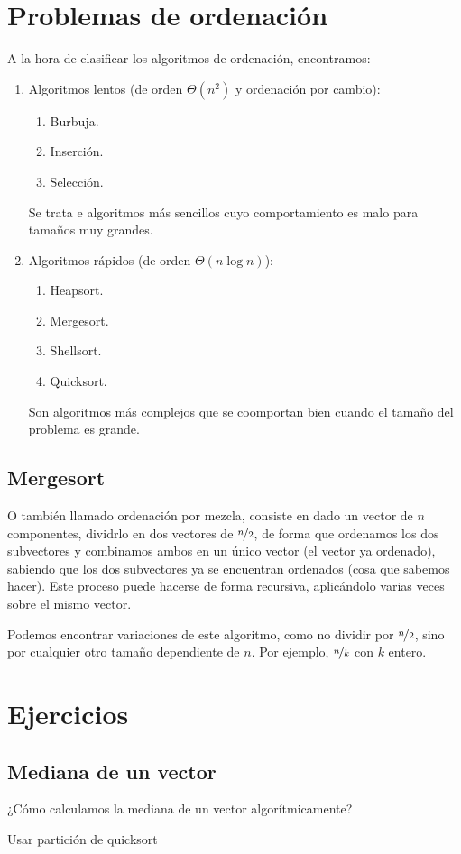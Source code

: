 \section{Problemas de ordenación}
A la hora de clasificar los algoritmos de ordenación, encontramos:
\begin{enumerate}
    \item Algoritmos lentos (de orden $\Theta(n^2)$ y ordenación por cambio):
        \begin{enumerate}
            \item Burbuja.
            \item Inserción.
            \item Selección.
        \end{enumerate}
        Se trata e algoritmos más sencillos cuyo comportamiento es malo para tamaños muy grandes.
    \item Algoritmos rápidos (de orden $\Theta(n\log n)$):
        \begin{enumerate}
            \item Heapsort.
            \item Mergesort.
            \item Shellsort.
            \item Quicksort.
        \end{enumerate}
        Son algoritmos más complejos que se coomportan bien cuando el tamaño del problema es grande.
\end{enumerate}


\subsection{Mergesort}
O también llamado ordenación por mezcla, consiste en dado un vector de $n$ componentes, dividrlo en dos vectores de $\nicefrac{n}{2}$, de forma que ordenamos los dos subvectores y combinamos ambos en un único vector (el vector ya ordenado), sabiendo que los dos subvectores ya se encuentran ordenados (cosa que sabemos hacer). Este proceso puede hacerse de forma recursiva, aplicándolo varias veces sobre el mismo vector.

Podemos encontrar variaciones de este algoritmo, como no dividir por $\nicefrac{n}{2}$, sino por cualquier otro tamaño dependiente de $n$. Por ejemplo, $\nicefrac{n}{k}$ con $k$ entero.

\section{Ejercicios}
\subsection{Mediana de un vector}
\begin{ejemplo}
    ¿Cómo calculamos la mediana de un vector algorítmicamente?

    Usar partición de quicksort
\end{ejemplo}

\begin{ejemplo}
    
\end{ejemplo}

\begin{ejemplo}
\end{ejemplo}


